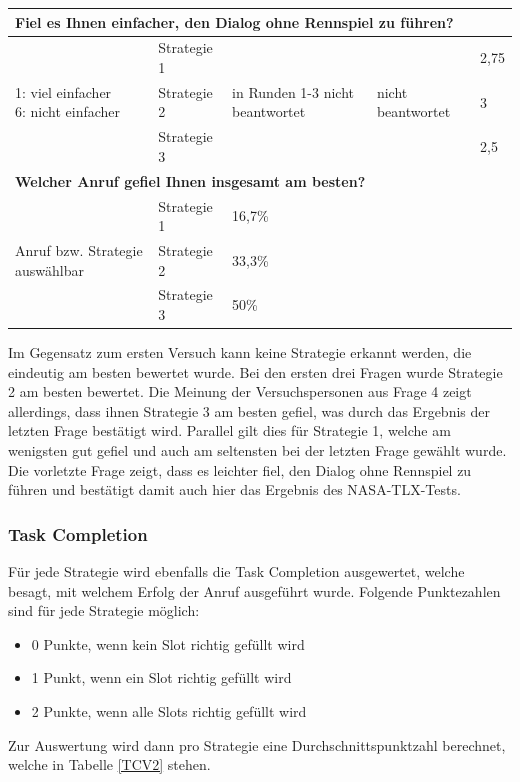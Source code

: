 \documentclass[12pt,a4paper]{scrartcl}
\begin{document}
\begin{longtable}{|p{4cm}|p{2cm}|p{2cm}|p{2cm}|p{2cm}|}
\hline
		\multicolumn{5}{l}{\textbf{Fiel es Ihnen einfacher, den Dialog ohne Rennspiel zu führen?}}\\
		\hline
\multirow{3}{4cm}{1: viel einfacher \newline  6: nicht einfacher} & Strategie 1 & \multirow{3}{2,5cm}{in Runden 1-3 nicht beantwortet} & \multirow{3}{2,5cm}{nicht beantwortet} & 2,75 \\
 & Strategie 2 & & & 3 \\
 & Strategie 3 & & & 2,5\\
\hline
		\multicolumn{5}{l}{\textbf{Welcher Anruf gefiel Ihnen insgesamt am besten?}}\\
		\hline
\multirow{3}{4cm}{Anruf bzw. Strategie auswählbar} & Strategie 1 & 16,7\% & & \\
 & Strategie 2 & 33,3\% && \\
 & Strategie 3 & 50\% && \\
\hline
\end{longtable}

Im Gegensatz zum ersten Versuch kann keine Strategie erkannt werden, die eindeutig am besten bewertet wurde. Bei den ersten drei Fragen wurde Strategie 2 am besten bewertet. Die Meinung der Versuchspersonen aus Frage 4 zeigt allerdings, dass ihnen Strategie 3 am besten gefiel, was durch das Ergebnis der letzten Frage bestätigt wird. Parallel gilt dies für Strategie 1, welche am wenigsten gut gefiel und auch am seltensten bei der letzten Frage gewählt wurde. \\

Die vorletzte Frage zeigt, dass es leichter fiel, den Dialog ohne Rennspiel zu führen und bestätigt damit auch hier das Ergebnis des NASA-TLX-Tests.

\subsubsection{Task Completion}
Für jede Strategie wird ebenfalls die Task Completion ausgewertet, welche besagt, mit welchem Erfolg der Anruf ausgeführt wurde. Folgende Punktezahlen sind für jede Strategie möglich:
\begin{itemize}
\item 0 Punkte, wenn kein Slot richtig gefüllt wird
\item 1 Punkt, wenn ein Slot richtig gefüllt wird
\item 2 Punkte, wenn alle Slots richtig gefüllt wird
\end{itemize}
Zur Auswertung wird dann pro Strategie eine Durchschnittspunktzahl berechnet, welche in Tabelle \ref{TCV2} stehen. 
\end{document}
